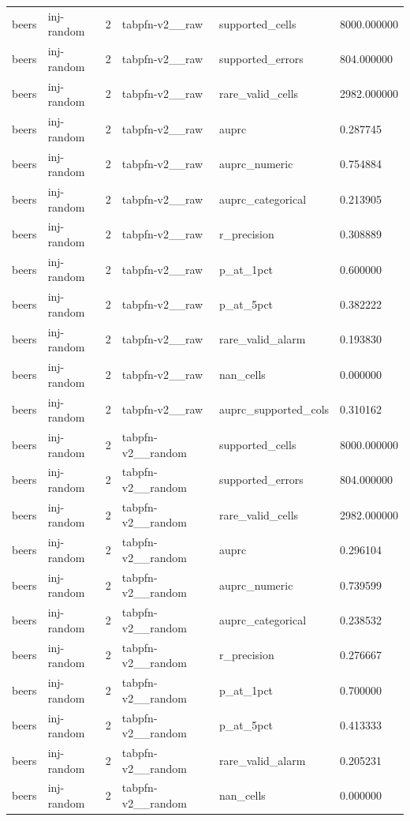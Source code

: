 \begin{tabular}{llllll}
beers & inj-random & 2 & tabpfn-v2\_\_raw & supported\_cells & 8000.000000 \\
beers & inj-random & 2 & tabpfn-v2\_\_raw & supported\_errors & 804.000000 \\
beers & inj-random & 2 & tabpfn-v2\_\_raw & rare\_valid\_cells & 2982.000000 \\
beers & inj-random & 2 & tabpfn-v2\_\_raw & auprc & 0.287745 \\
beers & inj-random & 2 & tabpfn-v2\_\_raw & auprc\_numeric & 0.754884 \\
beers & inj-random & 2 & tabpfn-v2\_\_raw & auprc\_categorical & 0.213905 \\
beers & inj-random & 2 & tabpfn-v2\_\_raw & r\_precision & 0.308889 \\
beers & inj-random & 2 & tabpfn-v2\_\_raw & p\_at\_1pct & 0.600000 \\
beers & inj-random & 2 & tabpfn-v2\_\_raw & p\_at\_5pct & 0.382222 \\
beers & inj-random & 2 & tabpfn-v2\_\_raw & rare\_valid\_alarm & 0.193830 \\
beers & inj-random & 2 & tabpfn-v2\_\_raw & nan\_cells & 0.000000 \\
beers & inj-random & 2 & tabpfn-v2\_\_raw & auprc\_supported\_cols & 0.310162 \\
beers & inj-random & 2 & tabpfn-v2\_\_random & supported\_cells & 8000.000000 \\
beers & inj-random & 2 & tabpfn-v2\_\_random & supported\_errors & 804.000000 \\
beers & inj-random & 2 & tabpfn-v2\_\_random & rare\_valid\_cells & 2982.000000 \\
beers & inj-random & 2 & tabpfn-v2\_\_random & auprc & 0.296104 \\
beers & inj-random & 2 & tabpfn-v2\_\_random & auprc\_numeric & 0.739599 \\
beers & inj-random & 2 & tabpfn-v2\_\_random & auprc\_categorical & 0.238532 \\
beers & inj-random & 2 & tabpfn-v2\_\_random & r\_precision & 0.276667 \\
beers & inj-random & 2 & tabpfn-v2\_\_random & p\_at\_1pct & 0.700000 \\
beers & inj-random & 2 & tabpfn-v2\_\_random & p\_at\_5pct & 0.413333 \\
beers & inj-random & 2 & tabpfn-v2\_\_random & rare\_valid\_alarm & 0.205231 \\
beers & inj-random & 2 & tabpfn-v2\_\_random & nan\_cells & 0.000000 \\

\end{tabular}
